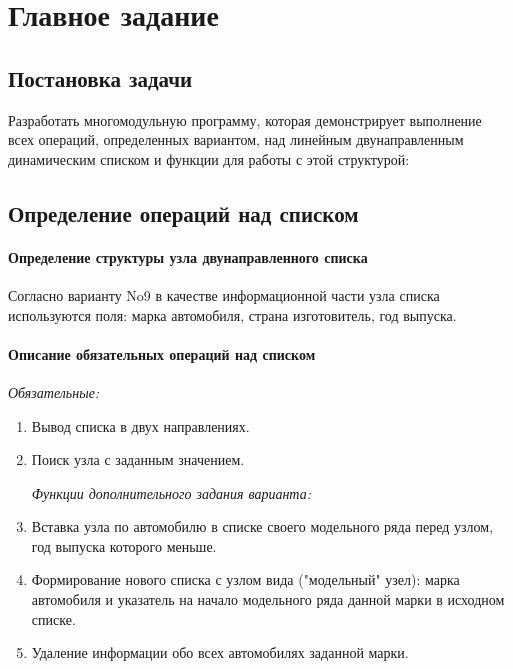 \documentclass[a4paper, 14pt]{extarticle}
\begin{document}

\newpage
\tableofcontents
\newpage
\section{Главное задание}
\subsection{Постановка задачи}
Разработать многомодульную программу, которая демонстрирует
выполнение всех операций, определенных вариантом, над линейным
двунаправленным динамическим списком и функции для работы с этой структурой:

\subsection{Определение операций над списком}
\paragraph{Определение структуры узла двунаправленного списка}
Согласно варианту No9 в качестве информационной части узла списка
используются поля: марка автомобиля, страна изготовитель,
год выпуска.
\paragraph{Описание обязательных операций над списком}

\textit{Обязательные:}
\begin{enumerate}
  \item Вывод списка в двух направлениях.
  \item Поиск узла с заданным значением.

    \textit{Функции дополнительного задания варианта:}
  \item Вставка узла по автомобилю в списке своего модельного ряда
    перед узлом, год выпуска которого меньше.
  \item Формирование нового списка с узлом вида ("модельный" узел): марка автомобиля
    и указатель на начало модельного ряда данной марки в исходном списке.
  \item Удаление информации обо всех автомобилях заданной марки.
\end{enumerate}

\newpage
\end{document}
